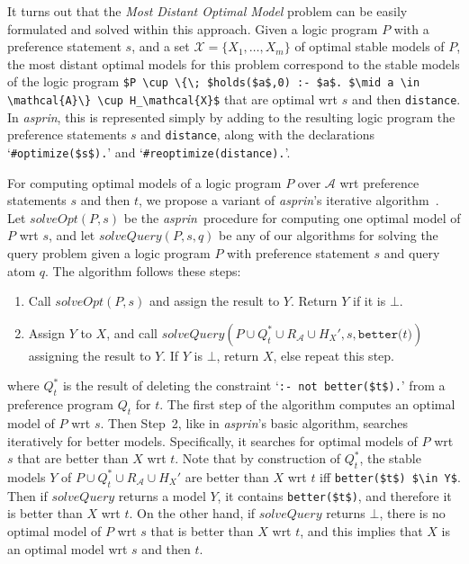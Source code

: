 \documentclass[a4paper,USenglish]{oasics-v2016}
\newcommand{\lm}[1]{\lstinline[mathescape=true]!#1!}
\newcommand{\sysfont}{\textit}
\newcommand{\asprin}{\sysfont{asprin}}
\begin{document}
It turns out that the \emph{Most Distant Optimal Model} problem can be easily formulated and solved within this approach.
%
Given a logic program $P$ with a preference statement $s$, 
and a set $\mathcal{X}=\{ X_1, \ldots, X_m \}$ of optimal stable models of $P$, 
the most distant optimal models for this problem correspond to the stable models of the logic program
\lstinline[mathescape=true]!$P \cup \{\; $holds($a$,0) :- $a$. $\mid a \in \mathcal{A}\} \cup H_\mathcal{X}$!
that are optimal wrt $s$ and then \lm{distance}.
%
In \asprin, this is represented simply by adding to the resulting logic program 
the preference statements $s$ and \lm{distance}, 
along with the declarations `\lm{#optimize($s$).}' and `\lm{#reoptimize(distance).}'.

For computing optimal models of a logic program $P$ over $\mathcal{A}$ wrt preference statements $s$ and then $t$, 
we propose a variant of \asprin's iterative algorithm~\cite{brderosc15a}.
%
Let $\mathit{solveOpt}(P,s)$ be the \asprin\ procedure for computing one optimal model of $P$ wrt $s$, 
and let $\mathit{solveQuery}(P,s,q)$ be any of our algorithms for solving the query problem  
given a logic program $P$ with preference statement $s$ and query atom $q$.
%
The algorithm follows these steps:
\begin{enumerate}
\item
Call $\mathit{solveOpt}(P,s)$ and assign the result to $Y$. Return $Y$ if it is $\bot$.
\item
Assign $Y$ to $X$, and call $\mathit{solveQuery}(P \cup Q_t^* \cup R_\mathcal{A} \cup H_{X}',s,\mathtt{better(}t\mathtt{)})$ assigning the result to $Y$.
If $Y$ is $\bot$, return $X$, else repeat this step.
\end{enumerate}
where $Q_t^*$ is the result of deleting the constraint `\lm{:- not better($t$).}' 
from a preference program $Q_t$ for $t$.
%
The first step of the algorithm computes an optimal model of $P$ wrt $s$.
%
Then Step~2, like in \asprin's basic algorithm, searches iteratively for better models. 
%
Specifically, it searches for optimal models of $P$ wrt $s$ that are better than $X$ wrt $t$.
%
Note that by construction of $Q_t^*$, 
the stable models $Y$ of $P \cup Q_t^* \cup R_\mathcal{A} \cup H_{X}'$ 
are better than $X$ wrt $t$ iff \lm{better($t$) $\in Y$}. 
%
Then if $\mathit{solveQuery}$ returns a model $Y$, it contains \lm{better($t$)},
and therefore it is better than $X$ wrt $t$.
%
On the other hand, if $\mathit{solveQuery}$ returns $\bot$, there is no optimal model of $P$ wrt $s$ that is better than $X$ wrt $t$, 
and this implies that $X$ is an optimal model wrt $s$ and then $t$.
\end{document}
